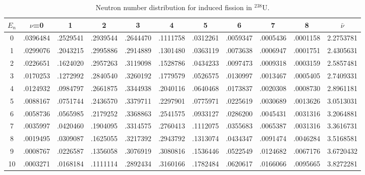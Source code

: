 \begin{table}[ht]
\footnotesize
\begin{center}
\begin{tabular}{|c|ccccccccc|c|} \hline
$E_n$ & $\nu$=0 & 1 & 2 & 3 & 4 & 5 & 6 & 7 & 8 & $\bar{\nu}$ \\ \hline
0 & .0396484 & .2529541 & .2939544 & .2644470 & .1111758 & .0312261 & .0059347 & .0005436 & .0001158 & 2.2753781 \\
1 & .0299076 & .2043215 & .2995886 & .2914889 & .1301480 & .0363119 & .0073638 & .0006947 & .0001751 & 2.4305631 \\
2 & .0226651 & .1624020 & .2957263 & .3119098 & .1528786 & .0434233 & .0097473 & .0009318 & .0003159 & 2.5857481 \\
3 & .0170253 & .1272992 & .2840540 & .3260192 & .1779579 & .0526575 & .0130997 & .0013467 & .0005405 & 2.7409331 \\
4 & .0124932 & .0984797 & .2661875 & .3344938 & .2040116 & .0640468 & .0173837 & .0020308 & .0008730 & 2.8961181 \\
5 & .0088167 & .0751744 & .2436570 & .3379711 & .2297901 & .0775971 & .0225619 & .0030689 & .0013626 & 3.0513031 \\
6 & .0058736 & .0565985 & .2179252 & .3368863 & .2541575 & .0933127 & .0286200 & .0045431 & .0031316 & 3.2064881 \\
7 & .0035997 & .0420460 & .1904095 & .3314575 & .2760413 & .1112075 & .0355683 & .0065387 & .0031316 & 3.3616731 \\
8 & .0019495 & .0309087 & .1625055 & .3217392 & .2943792 & .1313074 & .0434347 & .0091474 & .0046284 & 3.5168581 \\
9 & .0008767 & .0226587 & .1356058 & .3076919 & .3080816 & .1536446 & .0522549 & .0124682 & .0067176 & 3.6720432 \\
10& .0003271 & .0168184 & .1111114 & .2892434 & .3160166 & .1782484 & .0620617 & .0166066 & .0095665 & 3.8272281 \\ \hline
\end{tabular}
\end{center}
\caption{Neutron number distribution for induced fission in $^{238}$U.}
\label{Neutron number distribution for induced fission in 238U}
\end{table}

